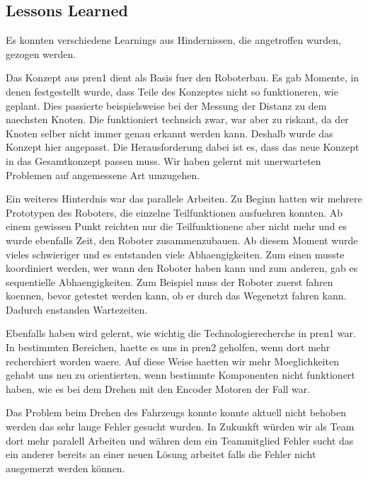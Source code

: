 \subsection{Lessons Learned}

Es konnten verschiedene Learnings aus Hindernissen, die angetroffen wurden, gezogen werden.

Das Konzept aus \acrshort{pren1} dient als Basis fuer den Roboterbau. Es gab Momente, in denen festgestellt wurde, dass Teile des Konzeptes nicht so funktioneren, wie geplant. Dies passierte beispielsweise bei der Messung der Distanz zu dem naechsten Knoten. Die funktioniert technsich zwar, war aber zu riskant, da der Knoten selber nicht immer genau erkannt werden kann. Deshalb wurde das Konzept hier angepasst. Die Herausforderung dabei ist es, dass das neue Konzept in das Gesamtkonzept passen muss. Wir haben gelernt mit unerwarteten Problemen auf angemessene Art umzugehen.

Ein weiteres Hinterdnis war das parallele Arbeiten. Zu Beginn hatten wir mehrere Prototypen des Roboters, die einzelne Teilfunktionen ausfuehren konnten. Ab einem gewissen Punkt reichten nur die Teilfunktionene aber nicht mehr und es wurde ebenfalls Zeit, den Roboter zusammenzubauen. Ab diesem Moment wurde vieles schwieriger und es entstanden viele Abhaengigkeiten. Zum einen musste koordiniert werden, wer wann den Roboter haben kann und zum anderen, gab es sequentielle Abhaengigkeiten. Zum Beispiel muss der Roboter zuerst fahren koennen, bevor getestet werden kann, ob er durch das Wegenetzt fahren kann. Dadurch enstanden Wartezeiten.

Ebenfalls haben wird gelernt, wie wichtig die Technologierecherche in \acrshort{pren1} war. In bestimmten Bereichen, haette es uns in \acrshort{pren2} geholfen, wenn dort mehr recherchiert worden waere. Auf diese Weise haetten wir mehr Moeglichkeiten gehabt uns neu zu orientierten, wenn bestimmte Komponenten nicht funktionert haben, wie es bei dem Drehen mit den Encoder Motoren der Fall war.

Das Problem beim Drehen des Fahrzeugs konnte konnte aktuell nicht behoben werden das sehr lange Fehler gesucht wurden. In Zukunkft würden wir als Team dort mehr paralell Arbeiten und währen dem ein Teammitglied Fehler sucht das ein anderer bereits an einer neuen Lösung arbeitet falls die Fehler nicht ausgemerzt werden können. 